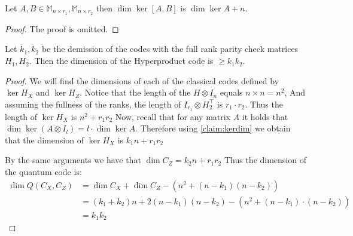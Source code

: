 \begin{claim}
  \label{claim:kerdim}
  Let  $A,B \in \mathbb{M}_{n\times r_{1}}, \mathbb{M}_{n\times r_{2}}$ then  $\dim \ker [A ,B]$ is $ \dim \ker A + n $. 
\end{claim}

\begin{proof}
  The proof is omitted. 
\end{proof}

\begin{claim}
  Let $k_{1},k_{2}$ be the demission of the codes with the full rank  parity check matrices $H_{1},H_{2}$. Then the dimension of the Hyperproduct code is $ \ge k_{1}k_{2}$. 
\end{claim}

\begin{proof}

  We will find the dimensions of each of the classical codes defined by $\ker H_{X}$ and $ \ker H_{Z}$. Notice that the length of the $H \otimes I_{n}$ equals $n\times n = n^2$, And  assuming the fullness of the ranks, the length of $ I_{r_{1}} \otimes  H_{2}^{\top} $  is $ r_{1}\cdot r_{2}$. Thus the length of $ \ker H_{X}$ is  $n^{2} + r_{1}r_{2}$ 
  Now, recall that for any matrix $A$ it holds that $\dim \ker \left( A \otimes I_{l} \right) = l \cdot \dim \ker A$. Therefore using \cref{claim:kerdim} we obtain that the dimension of $\ker H_{X}$ is $k_{1}n + r_{1}r_{2}$ 

  By the same arguments we have that $\dim C_{Z} = k_{2}n + r_{1}r_{2}$ %
Thus the dimension of the quantum code is:
  \begin{equation*}
    \begin{split}
      \dim Q\left( C_{X}, C_{Z} \right) &= \dim C_{X} + \dim C_{Z} - \left(  n^{2} + (n-k_{1})(n-k_{2})  \right) \\ 
      & = \left( k_{1} + k_{2} \right)n + 2(n-k_{1})(n-k_{2}) -\left(  n^{2} +  (n-k_{1}) \cdot \left( n -k_{2}\right) \right) \\
      & =k_{1}k_{2} 
    \end{split}
  \end{equation*}
\end{proof}

